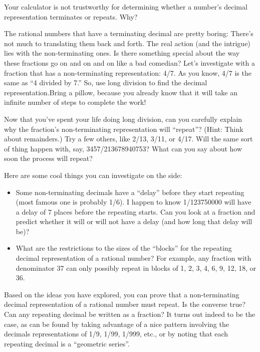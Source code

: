 \begin{question} Your calculator is not trustworthy for determining whether a number's decimal representation terminates or repeats.  Why?  
\end{question}
\QM

The rational numbers that have a terminating decimal are pretty boring:  There's not much to translating them back and forth.  The real action (and the intrigue) lies with the non-terminating ones.  Is there something special about the way these fractions go on and on and on like a bad comedian?  Let's investigate with a fraction that has a non-terminating representation:  4/7.  As you know, 4/7 is the same as ``4 divided by 7.''  So, use long division to find the decimal representation.Bring a pillow, because you already know that it will take an infinite number of steps to complete the work!

Now that you've spent your life doing long division, can you carefully explain why the fraction's non-terminating representation will ``repeat''?  (Hint:  Think about remainders.)  Try a few others, like 2/13, 3/11, or 4/17.  Will the same sort of thing happen with, say, 3457/213678940753?  What can you say about how soon the process will repeat?  

Here are some cool things you can investigate on the side:
\begin{itemize}
\item Some non-terminating decimals have a ``delay'' before they start repeating (most famous one is probably 1/6).  I happen to know 1/123750000 will have a delay of 7 places before the repeating starts.  Can you look at a fraction and predict whether it will or will not have a delay (and how long that delay will be)?   
\item What are the restrictions to the sizes of the ``blocks'' for the repeating decimal representation of a rational number?  For example, any fraction with denominator 37 can only possibly repeat in blocks of 1, 2, 3, 4, 6, 9, 12, 18, or 36.
\end{itemize}

Based on the ideas you have explored, you can prove that a non-terminating decimal representation of a rational number must repeat.  Is the converse true?  Can any repeating decimal be written as a fraction?  It turns out indeed to be the case, as can be found by taking advantage of a nice pattern involving the decimals representations of 1/9, 1/99, 1/999, etc., or by noting that each repeating decimal is a ``geometric series''.

